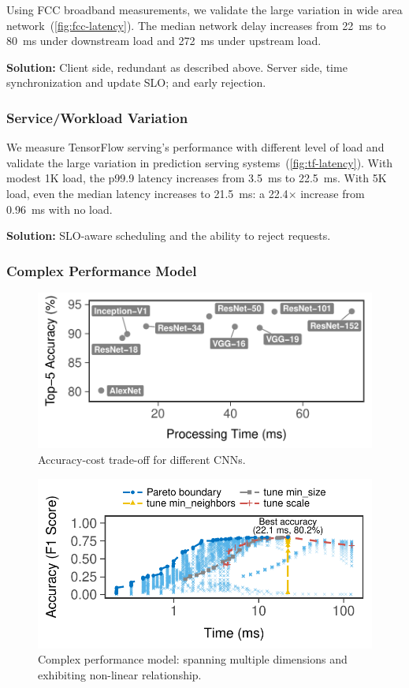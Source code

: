Using FCC broadband measurements, we validate the large variation in wide area
network~(\autoref{fig:fcc-latency}). The median network delay increases from
\SI{22}{\ms} to \SI{80}{\ms} under downstream load and \SI{272}{\ms} under
upstream load.

\textbf{Solution:} Client side, redundant as described above. Server side, time
synchronization and update SLO; and early rejection.

\subsubsection*{Service/Workload Variation}

\noindent We measure TensorFlow serving's performance with different level of load and
validate the large variation in prediction serving
systems~(\autoref{fig:tf-latency}). With modest 1K load, the p99.9 latency
increases from \SI{3.5}{\ms} to \SI{22.5}{\ms}. With 5K load, even the median
latency increases to \SI{21.5}{\ms}: a 22.4$\times$ increase from \SI{0.96}{\ms}
with no load.

\textbf{Solution:} SLO-aware scheduling and the ability to reject requests.

\subsubsection*{Complex Performance Model}

\begin{figure}[t]
  \centering
  \includegraphics[width=.9\columnwidth]{figures/tradeoff-cnn.pdf}
  \caption{Accuracy-cost trade-off for different CNNs.}
  \label{fig:tradeoff-cnn}
\end{figure}

\begin{figure}[t]
  \centering
  \includegraphics[width=.9\columnwidth]{figures/exhaustive-face.pdf}
  \caption{Complex performance model: spanning multiple dimensions and
    exhibiting non-linear relationship.}
  \label{fig:complex-perf-model}
\end{figure}

